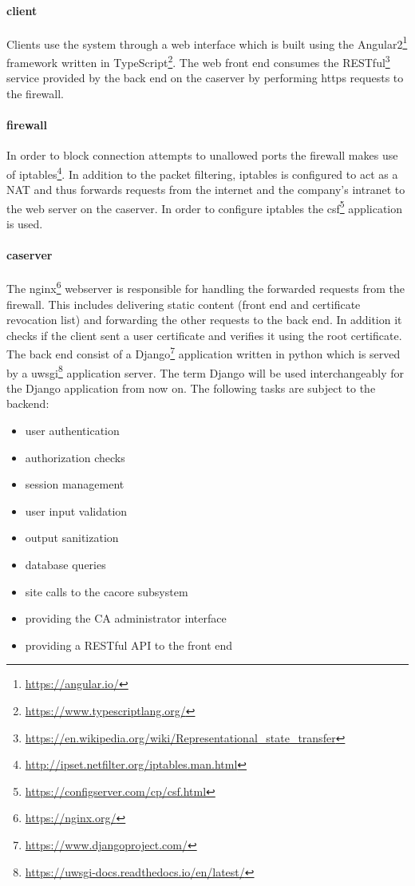 \documentclass[english]{article}
\begin{document}
 \paragraph{client} 
 Clients use the system through a web interface which is built using the  Angular2\footnote{\url{https://angular.io/}} framework written in TypeScript\footnote{\url{https://www.typescriptlang.org/}}. The web front end consumes the RESTful\footnote{\label{restful}\url{https://en.wikipedia.org/wiki/Representational_state_transfer}} service provided by the back end on the caserver by performing https requests to the firewall. 
 
 \paragraph{firewall}
 In order to block connection attempts to unallowed ports the firewall makes use of iptables\footnote{\url{http://ipset.netfilter.org/iptables.man.html}}. In addition to the packet filtering, iptables is configured to act as a NAT and thus forwards requests from the internet and the company's intranet to the web server on the caserver. In order to configure iptables the csf\footnote{\url{https://configserver.com/cp/csf.html}} application is used.
 
 \paragraph{caserver}
The nginx\footnote{\url{https://nginx.org/}} webserver is responsible for handling the forwarded requests from the firewall. This includes delivering static content (front end and certificate revocation list) and forwarding the other requests to the back end. In addition it checks if the client sent a user certificate and verifies it using the root certificate. \\The back end consist of a Django\footnote{\label{django}\url{https://www.djangoproject.com/}} application written in python which is served by a uwsgi\footnote{\url{https://uwsgi-docs.readthedocs.io/en/latest/}} application server. The term Django will be used interchangeably for the Django application from now on. The following tasks are subject to the backend: 

\begin{itemize}
\item user authentication
\item authorization checks
\item session management
\item user input validation
\item output sanitization
\item database queries
\item site calls to the cacore subsystem
\item providing the CA administrator interface
\item providing a RESTful API to the front end
\end{itemize}
\end{document}
